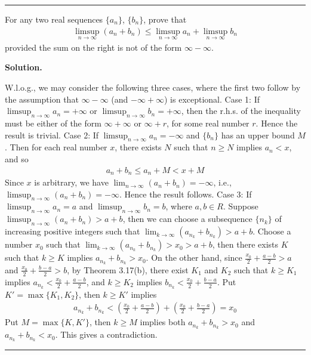 \documentclass[12pt]{article}
\theoremstyle{definition}
\begin{document}
\bigskip\noindent\hrule\bigskip

For any two real sequences $\{a_n\}$, $\{b_n\}$, prove that
\begin{align*}
\limsup_{n\to\infty}\left(a_n+b_n\right)\le\limsup_{n\to\infty}a_n+\limsup_{n\to\infty}b_n
\end{align*}
provided the sum on the right is not of the form $\infty-\infty$.

\smallskip
\noindent\textbf{Solution.}\quad

W.l.o.g., we may consider the following three cases, where the first two follow by the assumption that $\infty-\infty$ (and $-\infty+\infty$) is exceptional.
Case 1: If $\limsup_{n\to\infty} a_n=+\infty$ or $\limsup_{n\to\infty} b_n=+\infty$, then the r.h.s. of the inequality must be either of the form $\infty+\infty$ or $\infty+r$, for some real number $r$. Hence the result is trivial.
Case 2: If $\limsup_{n\to\infty} a_n=-\infty$ and $\{b_n\}$ has an upper bound $M$. Then for each real number $x$, there exists $N$ such that $n\ge N$ implies $a_n<x$, and so
\begin{align*}
a_n+b_n\le a_n+M<x+M
\end{align*}
Since $x$ is arbitrary, we have $\lim_{n\to\infty}\left(a_n+b_n\right)=-\infty$, i.e., $\limsup_{n\to\infty}\left(a_n+b_n\right)=-\infty$. Hence the result follows.
Case 3: If $\limsup_{n\to\infty}a_n=a$ and $\limsup_{n\to\infty}b_n=b$, where $a,b\in R$. Suppose $\limsup_{n\to\infty}\left(a_n+b_n\right)>a+b$, then we can choose a subsequence $\{n_k\}$ of increasing positive integers such that $\lim_{k\to\infty}\left(a_{n_k}+b_{n_k}\right)>a+b$. Choose a number $x_0$ such that $\lim_{k\to\infty}\left(a_{n_k}+b_{n_k}\right)>x_0>a+b$, then there exists $K$ such that $k\ge K$ implies $a_{n_k}+b_{n_k}>x_0$. On the other hand, since $\frac{x_0}{2}+\frac{a-b}{2}>a$ and $\frac{x_0}{2}+\frac{b-a}{2}>b$, by Theorem 3.17(b), there exist $K_1$ and $K_2$ such that $k\ge K_1$ implies $a_{n_k}<\frac{x_0}{2}+\frac{a-b}{2}$, and $k\ge K_2$ implies $b_{n_k}<\frac{x_0}{2}+\frac{b-a}{2}$. Put $K'=\max\{K_1,K_2\}$, then $k\ge K'$ implies
\begin{align*}
a_{n_k}+b_{n_k}<\left(\frac{x_0}{2}+\frac{a-b}{2}\right)+\left(\frac{x_0}{2}+\frac{b-a}{2}\right)=x_0
\end{align*}
Put $M=\max\{K,K'\}$, then $k\ge M$ implies both $a_{n_k}+b_{n_k}>x_0$ and $a_{n_k}+b_{n_k}<x_0$. This gives a contradiction.



\bigskip\noindent\hrule\bigskip
\end{document}
